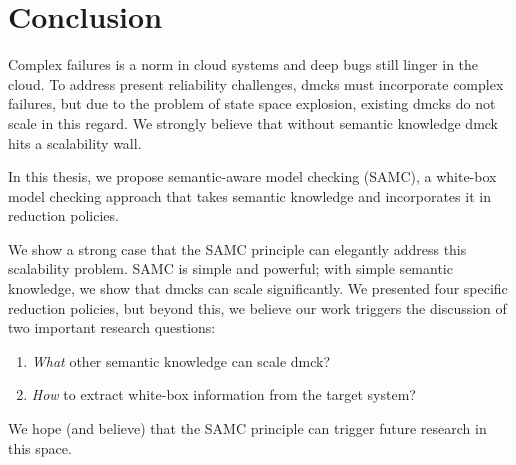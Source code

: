 \section{Conclusion}
\label{sec-conclude}

Complex failures is a norm in cloud systems and deep bugs still linger in the
cloud.  To address present reliability challenges, dmcks must incorporate
complex failures, but due to the problem of state space explosion, existing
dmcks do not scale in this regard.  We strongly believe that without semantic
knowledge dmck hits a scalability wall.

In this thesis, we propose semantic-aware model checking (SAMC), a white-box
model checking approach that takes semantic knowledge and incorporates it in
reduction policies. 

We show a strong case that the SAMC principle can elegantly address this
scalability problem.  SAMC is simple and powerful; with simple semantic
knowledge, we show that dmcks can scale significantly.  We presented four
specific reduction policies, but beyond this, we believe our work triggers the
discussion of two important research questions: 
\begin{enumerate}
\item {\em What} other semantic knowledge can scale dmck?
\item {\em How} to extract white-box information from the target system? 
\end{enumerate}
We hope (and believe) that the SAMC principle can trigger future research in this
space.  

